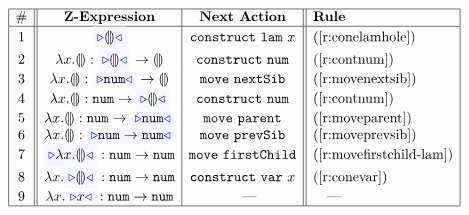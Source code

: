 \begin{figure}[t!]
\[
\begin{array}{|c||c|c||l|l|}
\hline
\# & \textbf{Z-Expression} & 
\textbf{Next Action} & \textbf{Rule}
\\
\hline
1 &
\zwsel{\hhole{}} & 
\aConstruct{\flam{x}} & 
\text{(\ref{r:conelamhole})}
\\ 2 &
\hlam{x}{\hhole{}} : \tarr{\zwsel{\hhole{}}}{\hhole{}} & 
\aConstruct{\fnum{}} &
\text{(\ref{r:contnum})}
\\ 3 &
\hlam{x}{\hhole{}} : \tarr{\zwsel{\tnum{}}}{\hhole{}} &
\aMove{\dNext{}} & 
\text{({\ref{r:movenextsib}})}
\\ 4 &
\hlam{x}{\hhole{}} : \tarr{\tnum}{\zwsel{\hhole{}}}
&
\aConstruct{\fnum{}} & 
\text{(\ref{r:contnum})}
\\ 5 &
\hlam{x}{\hhole{}} : \tarr{\tnum{}}{\zwsel{\tnum{}}} & 
\aMove{\dParent{}} & 
\text{(\ref{r:moveparent})}
\\ 6 &
\hlam{x}{\hhole{}} : \zwsel{\tarr{\tnum{}}{\tnum{}}}
&
\aMove{\dPrev{}} & 
\text{(\ref{r:moveprevsib})}
\\ 7 &
\zwsel{\hlam{x}{\hhole{}}} : \tarr{\tnum{}}{\tnum{}} & 
\aMove{\dChild{}} & 
\text{(\ref{r:movefirstchild-lam})}
\\ 8 &
\hlam{x}{\zwsel{\hhole{}}} : \tarr{\tnum{}}{\tnum{}} &
\aConstruct{\fvar{x}} & 
\text{(\ref{r:conevar})}
\\ 9 &
\hlam{x}{\zwsel{{x}}} : \tarr{\tnum{}}{\tnum{}} &
\quad\textrm{---}
&
\quad\textrm{---}
\\
\hline

\end{array}\]
\end{figure}
